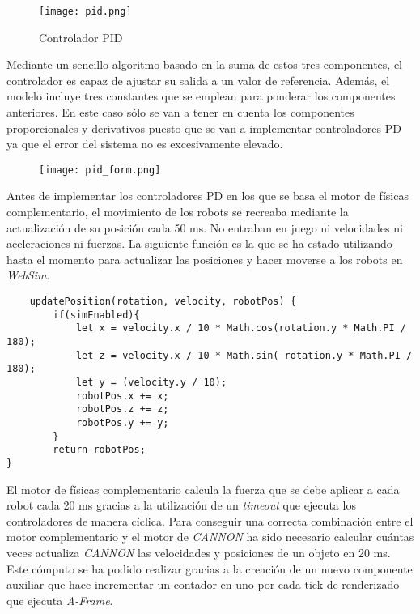 \begin{figure}[h!]
    \centering
    \texttt{[image: pid.png]}
    \caption{Controlador PID \footnotemark}
    \label{fig:pid}
\end{figure}

Mediante un sencillo algoritmo basado en la suma de estos tres componentes, el controlador es capaz de ajustar su salida a un valor de referencia. Además, el modelo incluye tres constantes que se emplean para ponderar los componentes anteriores. En este caso sólo se van a tener en cuenta los componentes proporcionales y derivativos puesto que se van a implementar controladores PD ya que el error del sistema no es excesivamente elevado.\newline 

\begin{figure}[h!]
    \centering
    \texttt{[image: pid\_form.png]}
    \label{fig:pid_form}
\end{figure}

Antes de implementar los controladores PD en los que se basa el motor de físicas complementario, el movimiento de los robots se recreaba mediante la actualización de su posición cada 50 ms. No entraban en juego ni velocidades ni aceleraciones ni fuerzas. La siguiente función es la que se ha estado utilizando hasta el momento para actualizar las posiciones y hacer moverse a los robots en \textit{WebSim}.

\small{
\begin{verbatim} 
    updatePosition(rotation, velocity, robotPos) {
        if(simEnabled){
            let x = velocity.x / 10 * Math.cos(rotation.y * Math.PI / 180);
            let z = velocity.x / 10 * Math.sin(-rotation.y * Math.PI / 180);
            let y = (velocity.y / 10);
            robotPos.x += x;
            robotPos.z += z;
            robotPos.y += y;
        }
        return robotPos;
}
\end{verbatim}
}

\normalsize
El motor de físicas complementario calcula la fuerza que se debe aplicar a cada robot cada 20 ms gracias a la utilización de un \textit{timeout} que ejecuta los controladores de manera cíclica. Para conseguir una correcta combinación entre el motor complementario y el motor de \textit{CANNON} ha sido necesario calcular cuántas veces actualiza \textit{CANNON} las velocidades y posiciones de un objeto en 20 ms. Este cómputo se ha podido realizar gracias a la creación de un nuevo componente auxiliar que hace incrementar un contador en uno por cada tick de renderizado que ejecuta \textit{A-Frame}. \newline

